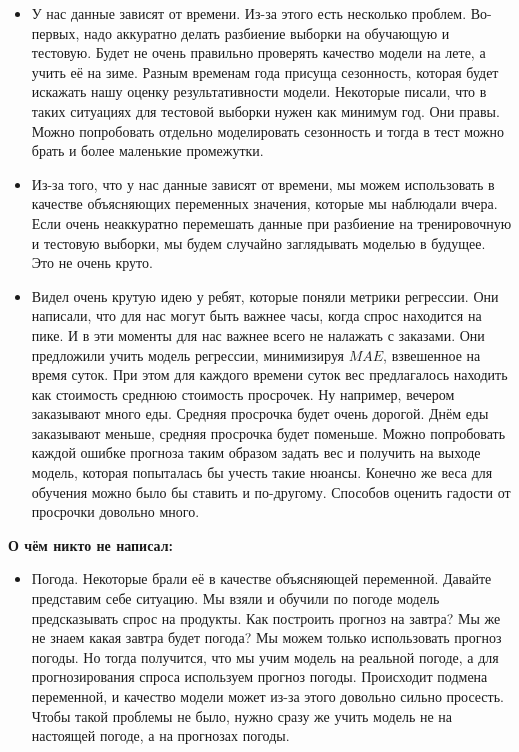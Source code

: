 \documentclass[12pt, a4paper, oneside]{article}
\begin{document}
\begin{itemize}
	\item  У нас данные зависят от времени. Из-за этого есть несколько проблем. Во-первых, надо аккуратно делать разбиение выборки на обучающую и тестовую. Будет не очень правильно проверять качество модели на лете, а учить её на зиме. Разным временам года присуща сезонность, которая будет искажать нашу оценку результативности модели. Некоторые писали, что в таких ситуациях для тестовой выборки нужен как минимум год. Они правы. Можно попробовать отдельно моделировать сезонность и тогда в тест можно брать и более маленькие промежутки. 
	\item Из-за того, что у нас данные зависят от времени, мы можем использовать в качестве объясняющих переменных значения, которые мы наблюдали вчера. Если очень неаккуратно перемешать данные при разбиение на тренировочную и тестовую выборки, мы будем случайно заглядывать моделью в будущее. Это не очень круто. 
	\item Видел очень крутую идею у ребят, которые поняли метрики регрессии. Они написали, что для нас могут быть важнее часы, когда спрос находится на пике. И в эти моменты для нас важнее всего не налажать с заказами. Они предложили учить модель регрессии, минимизируя $MAE$, взвешенное на время суток. При этом для каждого времени суток вес предлагалось находить как стоимость среднюю стоимость просрочек. Ну например, вечером заказывают много еды. Средняя просрочка будет очень дорогой. Днём еды заказывают меньше, средняя просрочка будет поменьше. Можно попробовать каждой ошибке прогноза таким образом задать вес и получить на выходе модель, которая попыталась бы учесть такие нюансы. Конечно же веса для обучения можно было бы ставить и по-другому. Способов оценить гадости от просрочки довольно много. 
\end{itemize}

\textbf{О чём никто не написал:} 

\begin{itemize}
	\item Погода. Некоторые брали её в качестве объясняющей переменной. Давайте представим себе ситуацию. Мы взяли и обучили по погоде модель предсказывать спрос на продукты. Как построить прогноз на завтра? Мы же не знаем какая завтра будет погода? Мы можем только использовать прогноз погоды. Но тогда получится, что мы учим модель на реальной погоде, а для прогнозирования спроса используем прогноз погоды. Происходит подмена переменной, и качество модели может из-за этого довольно сильно просесть. Чтобы такой проблемы не было, нужно сразу же учить модель не на настоящей погоде, а на прогнозах погоды. 
\end{itemize}
\end{document}
